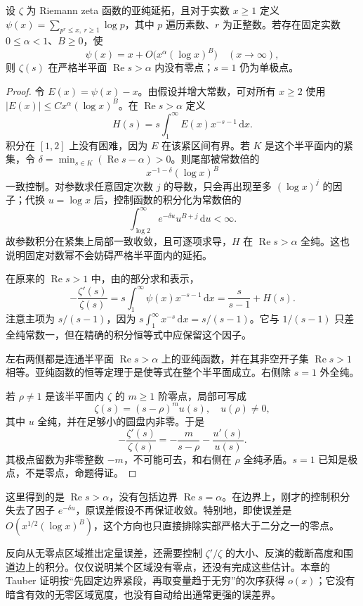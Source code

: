 \begin{proposition}[幂次误差蕴含无零点半平面]
\label{b3:prop:27-power-error-zero-free}
设 \(\zeta\) 为 Riemann zeta 函数的亚纯延拓，且对于实数 \(x\ge1\) 定义 \(\psi(x)=\sum_{p^r\le x,\ r\ge1}\log p\)，其中 \(p\) 遍历素数、\(r\) 为正整数。若存在固定实数 \(0\le\alpha<1\)、\(B\ge0\)，使
\[
 \psi(x)=x+O\bigl(x^\alpha(\log x)^B\bigr)
 \quad(x\to\infty),
\]
则 \(\zeta(s)\) 在严格半平面 \(\operatorname{Re}s>\alpha\) 内没有零点；\(s=1\) 仍为单极点。
\end{proposition}
\begin{proof}
令 \(E(x)=\psi(x)-x\)。由假设并增大常数，可对所有 \(x\ge2\) 使用 \(|E(x)|\le Cx^\alpha(\log x)^B\)。在 \(\operatorname{Re}s>\alpha\) 定义
\[
 H(s)=s\int_1^\infty E(x)x^{-s-1}\,\mathrm dx.
\]
积分在 \([1,2]\) 上没有困难，因为 \(E\) 在该紧区间有界。若 \(K\) 是这个半平面内的紧集，令 \(\delta=\min_{s\in K}(\operatorname{Re}s-\alpha)>0\)。则尾部被常数倍的
\[
 x^{-1-\delta}(\log x)^B
\]
一致控制。对参数求任意固定次数 \(j\) 的导数，只会再出现至多 \((\log x)^j\) 的因子；代换 \(u=\log x\) 后，控制函数的积分化为常数倍的
\[
 \int_{\log2}^\infty e^{-\delta u}u^{B+j}\,\mathrm du<\infty.
\]
故参数积分在紧集上局部一致收敛，且可逐项求导，\(H\) 在 \(\operatorname{Re}s>\alpha\) 全纯。这也说明固定对数幂不会妨碍严格半平面内的延拓。

在原来的 \(\operatorname{Re}s>1\) 中，由的部分求和表示，
\[
 -\frac{\zeta'(s)}{\zeta(s)}
 =s\int_1^\infty\psi(x)x^{-s-1}\,\mathrm dx
 =\frac{s}{s-1}+H(s).
\]
注意主项为 \(s/(s-1)\)，因为 \(s\int_1^\infty x^{-s}\,\mathrm dx=s/(s-1)\)。它与 \(1/(s-1)\) 只差全纯常数一，但在精确的积分恒等式中应保留这个因子。

左右两侧都是连通半平面 \(\operatorname{Re}s>\alpha\) 上的亚纯函数，并在其非空开子集 \(\operatorname{Re}s>1\) 相等。亚纯函数的恒等定理于是使等式在整个半平面成立。右侧除 \(s=1\) 外全纯。

若 \(\rho\ne1\) 是该半平面内 \(\zeta\) 的 \(m\ge1\) 阶零点，局部可写成
\[
 \zeta(s)=(s-\rho)^m u(s),\quad u(\rho)\ne0,
\]
其中 \(u\) 全纯，并在足够小的圆盘内非零。于是
\[
 -\frac{\zeta'(s)}{\zeta(s)}
 =-\frac m{s-\rho}-\frac{u'(s)}{u(s)}.
\]
其极点留数为非零整数 \(-m\)，不可能可去，和右侧在 \(\rho\) 全纯矛盾。\(s=1\) 已知是极点，不是零点，命题得证。
\end{proof}

这里得到的是 \(\operatorname{Re}s>\alpha\)，没有包括边界 \(\operatorname{Re}s=\alpha\)。在边界上，刚才的控制积分失去了因子 \(e^{-\delta u}\)，原误差假设不再保证收敛。特别地，即使误差是 \(O(x^{1/2}(\log x)^B)\)，这个方向也只直接排除实部严格大于二分之一的零点。

\ProseParagraphBreak

反向从无零点区域推出定量误差，还需要控制 \(\zeta'/\zeta\) 的大小、反演的截断高度和围道边上的积分。仅仅说明某个区域没有零点，还没有完成这些估计。本章的 Tauber 证明按“先固定边界紧段，再取变量趋于无穷”的次序获得 \(o(x)\)；它没有暗含有效的无零区域宽度，也没有自动给出通常更强的误差界。
